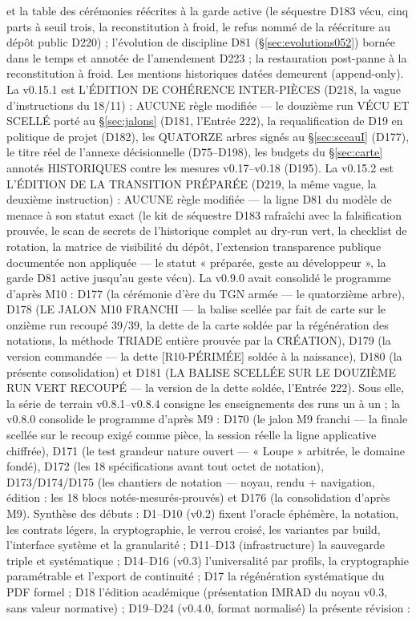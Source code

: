 et la table des cérémonies réécrites à la garde active (le séquestre D183
vécu, cinq parts à seuil trois, la reconstitution à froid, le refus nommé de
la réécriture au dépôt public D220) ; l'évolution de discipline D81 (§\ref{sec:evolutions052})
bornée dans le temps et annotée de l'amendement D223 ; la restauration
post-panne à la reconstitution à froid. Les mentions historiques datées
demeurent (append-only). La
v0.15.1 est L'ÉDITION DE COHÉRENCE INTER-PIÈCES (D218, la vague
d'instructions du 18/11) : AUCUNE règle modifiée — le douzième run
VÉCU ET SCELLÉ porté au §\ref{sec:jalons} (D181, l'Entrée 222), la
requalification de D19 en politique de projet (D182), les QUATORZE
arbres signés au §\ref{sec:sceauI} (D177), le titre réel de l'annexe
décisionnelle (D75--D198), les budgets du §\ref{sec:carte} annotés
HISTORIQUES contre les mesures v0.17--v0.18 (D195). La v0.15.2 est
L'ÉDITION DE LA TRANSITION PRÉPARÉE (D219, la même vague, la
deuxième instruction) : AUCUNE règle modifiée — la ligne D81 du
modèle de menace à son statut exact (le kit de séquestre D183
rafraîchi avec la falsification prouvée, le scan de secrets de
l'historique complet au dry-run vert, la checklist de rotation,
la matrice de visibilité du dépôt, l'extension transparence
publique documentée non appliquée — le statut « préparée, geste
au développeur », la garde D81 active jusqu'au geste vécu). La v0.9.0 avait
consolidé le programme d'après M10 : D177 (la cérémonie d'ère du TGN
armée — le quatorzième arbre), D178 (LE JALON M10 FRANCHI — la balise
 scellée par fait de carte sur le onzième run recoupé 39/39,
la dette de la carte soldée par la régénération des notations, la méthode TRIADE
entière prouvée par la CRÉATION), D179 (la version  commandée
— la dette [R10-PÉRIMÉE] soldée à la naissance), D180 (la présente
consolidation) et D181 (LA BALISE  SCELLÉE SUR LE DOUZIÈME
RUN VERT RECOUPÉ — la version de la dette soldée, l'Entrée 222). Sous elle, la série de terrain v0.8.1–v0.8.4
consigne les enseignements des runs un à un ; la v0.8.0 consolide le programme
d'après M9 : D170 (le jalon M9 franchi — la finale  scellée sur le
recoup exigé comme pièce, la session réelle la ligne applicative chiffrée),
D171 (le test grandeur nature ouvert — « Loupe » arbitrée, le domaine
 fondé), D172 (les 18 spécifications avant tout octet de notation),
D173/D174/D175 (les chantiers de notation — noyau, rendu + navigation, édition :
les 18 blocs notés-mesurés-prouvés) et D176 (la consolidation d'après M9).
Synthèse des débuts :
D1–D10 (v0.2) fixent l'oracle éphémère, la notation, les contrats légers, la
cryptographie, le verrou croisé, les variantes par build, l'interface système et la
granularité ; D11–D13 (infrastructure) la sauvegarde triple et systématique ; D14–D16
(v0.3) l'universalité par profils, la cryptographie paramétrable et l'export de
continuité ; D17 la régénération systématique du PDF formel ; D18 l'édition académique
(présentation IMRAD du noyau v0.3, sans valeur normative) ; D19–D24 (v0.4.0, format
normalisé) la présente révision :

